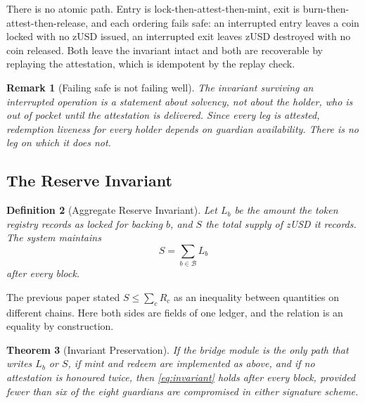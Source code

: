 \documentclass[11pt,a4paper]{article}
\newtheorem{theorem}{Theorem}[section]
\newtheorem{definition}[theorem]{Definition}
\newtheorem{remark}[theorem]{Remark}
\begin{document}
There is no atomic path. Entry is lock-then-attest-then-mint, exit is burn-then-attest-then-release, and each ordering fails safe: an interrupted entry leaves a coin locked with no zUSD issued, an interrupted exit leaves zUSD destroyed with no coin released. Both leave the invariant intact and both are recoverable by replaying the attestation, which is idempotent by the replay check.

\begin{remark}[Failing safe is not failing well]
The invariant surviving an interrupted operation is a statement about solvency, not about the holder, who is out of pocket until the attestation is delivered. Since every leg is attested, redemption liveness for every holder depends on guardian availability. There is no leg on which it does not.
\end{remark}

\subsection{The Reserve Invariant}

\begin{definition}[Aggregate Reserve Invariant]
Let $L_b$ be the amount the token registry records as locked for backing $b$, and $S$ the total supply of zUSD it records. The system maintains
\begin{equation}
\label{eq:invariant}
S = \sum_{b \in \mathcal{B}} L_b
\end{equation}
after every block.
\end{definition}

The previous paper stated $S \leq \sum_c R_c$ as an inequality between quantities on different chains. Here both sides are fields of one ledger, and the relation is an equality by construction.

\begin{theorem}[Invariant Preservation]
\label{thm:invariant}
If the bridge module is the only path that writes $L_b$ or $S$, if mint and redeem are implemented as above, and if no attestation is honoured twice, then \eqref{eq:invariant} holds after every block, provided fewer than six of the eight guardians are compromised in \emph{either} signature scheme.
\end{theorem}
\end{document}
